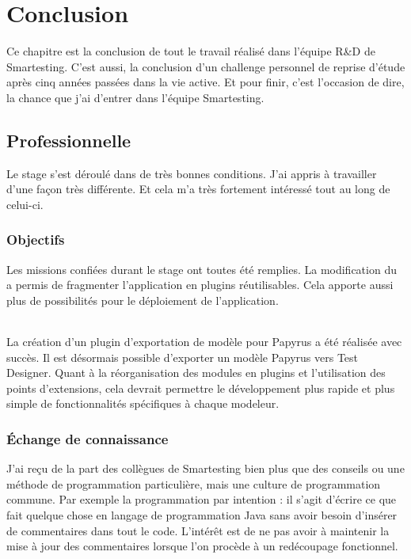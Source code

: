 \chapter{Conclusion}

Ce chapitre est la conclusion de tout le travail réalisé dans l'équipe R\&D de Smartesting.
C'est aussi, la conclusion d'un challenge personnel de reprise d'étude après cinq années passées dans la vie active.
Et pour finir, c'est l'occasion de dire, la chance que j'ai d'entrer dans l'équipe Smartesting.

\section{Professionnelle}

Le stage s'est déroulé dans de très bonnes conditions.
J'ai appris à travailler d'une façon très différente.
Et cela m'a très fortement intéressé tout au long de celui-ci.

\subsection{Objectifs}

Les missions confiées durant le stage ont toutes été remplies.
La modification du \build a permis de fragmenter l'application en plugins réutilisables.
Cela apporte aussi plus de possibilités pour le déploiement de l'application.

\subparagraph*{}
La création d'un plugin d'exportation de modèle pour Papyrus a été réalisée avec succès.
Il est désormais possible d'exporter un modèle Papyrus vers Test Designer. 
Quant à la réorganisation des modules en plugins et l'utilisation des points d'extensions, cela devrait permettre le développement plus rapide et plus simple de fonctionnalités spécifiques à chaque modeleur.

\subsection{Échange de connaissance}

J'ai reçu de la part des collègues de Smartesting bien plus que des conseils ou une méthode de programmation particulière, mais une culture de programmation commune.
Par exemple la programmation par intention : il s'agit d'écrire ce que fait quelque chose en langage de programmation Java sans avoir besoin d'insérer de commentaires dans tout le code.
L'intérêt est de ne pas avoir à maintenir la mise à jour des commentaires lorsque l'on procède à un redécoupage fonctionnel.

